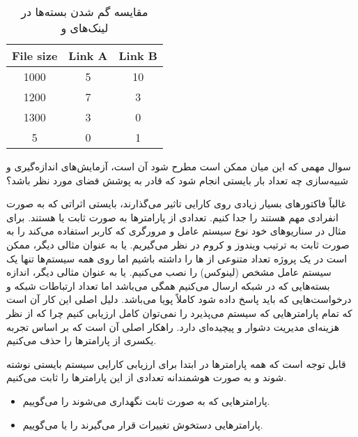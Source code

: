 \begin{LTR}
    \begin{table}[H]
        \centering
        \label{fig:packetLostLinks}
        \caption{مقایسه گم شدن بسته‌ها در لینک‌های  و }
        \begin{tabular}{ccc}
            \textbf{File size} & \textbf{Link A} & \textbf{Link B} \\ \hline
            1000 & 5 & 10 \\
            1200 & 7 & 3 \\
            1300 & 3 & 0 \\
            5 & 0 & 1 \\
        \end{tabular}
    \end{table}
\end{LTR}

سوال مهمی که این میان ممکن است مطرح شود آن است، آزمایش‌های اندازه‌گیری و
شبیه‌سازی چه تعداد بار بایستی انجام شود که قادر به پوشش فضای مورد نظر باشد؟

غالباً فاکتور‌های بسیار زیادی روی کارایی تاثیر می‌گذارند، بایستی اثراتی که به
صورت انفرادی مهم هستند را جدا کنیم. تعدادی از پارامتر‌ها به صورت ثابت یا
 هستند. برای مثال در سناریو‌های خود نوع سیستم عامل و مرورگری که کاربر
استفاده می‌کند را به صورت ثابت به ترتیب ویندوز و کروم در نظر می‌گیریم. یا به
عنوان مثالی دیگر، ممکن است در یک پروژه تعداد متنوعی از ها را داشته باشیم
اما روی همه سیستم‌ها تنها یک سیستم عامل مشخص (لینوکس) را نصب می‌کنیم. یا به
عنوان مثالی دیگر، اندازه بسته‌هایی که در شبکه ارسال می‌کنیم همگی 
می‌باشد اما تعداد ارتباطات شبکه و درخواست‌هایی که باید پاسخ داده شود کاملاً پویا
می‌باشد. دلیل اصلی این کار آن است که تمام پارامتر‌هایی که سیستم می‌پذیرد را
نمی‌توان کامل ارزیابی کنیم چرا که از نظر هزینه‌ای مدیریت دشوار و پیچیده‌ای دارد.
راهکار اصلی آن است که بر اساس تجربه یکسری از پارامتر‌ها را حذف می‌کنیم.

قابل توجه است که همه پارامتر‌ها در ابتدا برای ارزیابی کارایی سیستم بایستی نوشته
شوند و به صورت هوشمندانه تعدادی از این پارامتر‌ها را ثابت می‌کنیم.

\begin{itemize}
    \item پارامتر‌هایی که به صورت ثابت نگهداری می‌شوند را 
    می‌گوییم.
    \item پارامتر‌هایی دستخوش تغییرات قرار می‌گیرند را  یا
     می‌گوییم.
\end{itemize}

